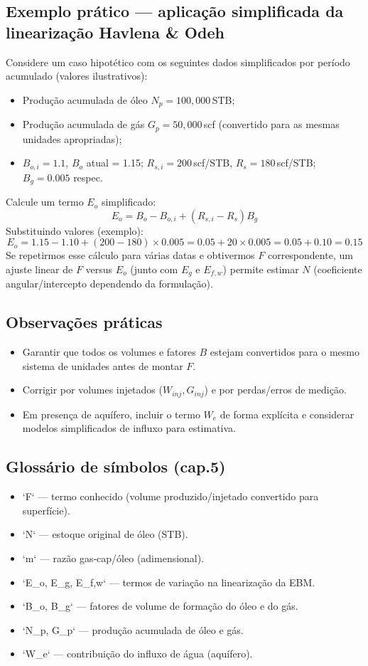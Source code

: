 \documentclass[11pt,a4paper]{article}
\begin{document}
\subsection{Exemplo prático — aplicação simplificada da linearização Havlena & Odeh}
Considere um caso hipotético com os seguintes dados simplificados por período acumulado (valores ilustrativos):
\begin{itemize}
\item Produção acumulada de óleo $N_p = 100{,}000\,$STB;
\item Produção acumulada de gás $G_p = 50{,}000\,$scf (convertido para as mesmas unidades apropriadas);
\item $B_{o,i}=1.1$, $B_o$ atual = 1.15; $R_{s,i}=200\,$scf/STB, $R_s=180\,$scf/STB; $B_g=0.005$ respec.
\end{itemize}

Calcule um termo $E_o$ simplificado:
$$
E_o = B_o - B_{o,i} + (R_{s,i} - R_s)B_g
$$
Substituindo valores (exemplo):
$$
E_o = 1.15 - 1.10 + (200-180)\times0.005 = 0.05 + 20\times0.005 = 0.05 + 0.10 = 0.15
$$
Se repetirmos esse cálculo para várias datas e obtivermos $F$ correspondente, um ajuste linear de $F$ versus $E_o$ (junto com $E_g$ e $E_{f,w}$) permite estimar $N$ (coeficiente angular/intercepto dependendo da formulação).

\subsection{Observações práticas}
\begin{itemize}
\item Garantir que todos os volumes e fatores $B$ estejam convertidos para o mesmo sistema de unidades antes de montar $F$.
\item Corrigir por volumes injetados ($W_{inj},G_{inj}$) e por perdas/erros de medição.
\item Em presença de aquífero, incluir o termo $W_e$ de forma explícita e considerar modelos simplificados de influxo para estimativa.
\end{itemize}

\subsection{Glossário de símbolos (cap.5)}
\begin{itemize}
\item `F` — termo conhecido (volume produzido/injetado convertido para superfície).
\item `N` — estoque original de óleo (STB).
\item `m` — razão gas‑cap/óleo (adimensional).
\item `E_o, E_g, E_{f,w}` — termos de variação na linearização da EBM.
\item `B_o, B_g` — fatores de volume de formação do óleo e do gás.
\item `N_p, G_p` — produção acumulada de óleo e gás.
\item `W_e` — contribuição do influxo de água (aquífero).
\end{itemize}
\end{document}
